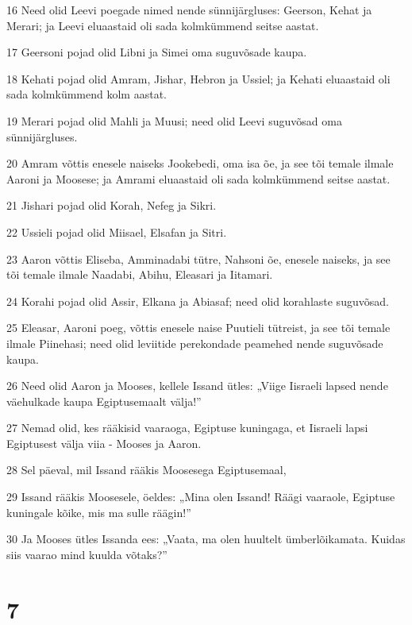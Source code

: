 \par 16 Need olid Leevi poegade nimed nende sünnijärgluses: Geerson, Kehat ja Merari; ja Leevi eluaastaid oli sada kolmkümmend seitse aastat.
\par 17 Geersoni pojad olid Libni ja Simei oma suguvõsade kaupa.
\par 18 Kehati pojad olid Amram, Jishar, Hebron ja Ussiel; ja Kehati eluaastaid oli sada kolmkümmend kolm aastat.
\par 19 Merari pojad olid Mahli ja Muusi; need olid Leevi suguvõsad oma sünnijärgluses.
\par 20 Amram võttis enesele naiseks Jookebedi, oma isa õe, ja see tõi temale ilmale Aaroni ja Moosese; ja Amrami eluaastaid oli sada kolmkümmend seitse aastat.
\par 21 Jishari pojad olid Korah, Nefeg ja Sikri.
\par 22 Ussieli pojad olid Miisael, Elsafan ja Sitri.
\par 23 Aaron võttis Eliseba, Amminadabi tütre, Nahsoni õe, enesele naiseks, ja see tõi temale ilmale Naadabi, Abihu, Eleasari ja Iitamari.
\par 24 Korahi pojad olid Assir, Elkana ja Abiasaf; need olid korahlaste suguvõsad.
\par 25 Eleasar, Aaroni poeg, võttis enesele naise Puutieli tütreist, ja see tõi temale ilmale Piinehasi; need olid leviitide perekondade peamehed nende suguvõsade kaupa.
\par 26 Need olid Aaron ja Mooses, kellele Issand ütles: „Viige Iisraeli lapsed nende väehulkade kaupa Egiptusemaalt välja!”
\par 27 Nemad olid, kes rääkisid vaaraoga, Egiptuse kuningaga, et Iisraeli lapsi Egiptusest välja viia - Mooses ja Aaron.
\par 28 Sel päeval, mil Issand rääkis Moosesega Egiptusemaal,
\par 29 Issand rääkis Moosesele, öeldes: „Mina olen Issand! Räägi vaaraole, Egiptuse kuningale kõike, mis ma sulle räägin!”
\par 30 Ja Mooses ütles Issanda ees: „Vaata, ma olen huultelt ümberlõikamata. Kuidas siis vaarao mind kuulda võtaks?”

\chapter{7}

